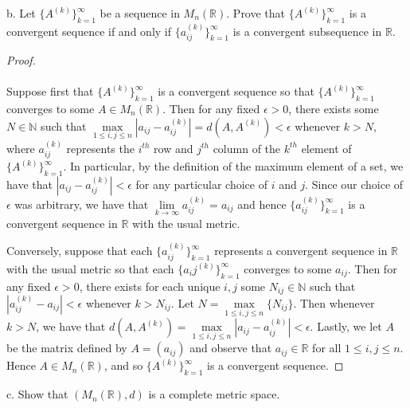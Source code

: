     \pagebreak

b.  Let $\{A^{(k)}\}_{k=1}^{\infty}$ be a sequence in $M_n(\mathbb{R})$. Prove that $\{A^{(k)}\}_{k=1}^{\infty}$ is a
    convergent sequence if and only if $\{a_{ij}^{(k)}\}_{k=1}^{\infty}$ is a convergent subsequence in $\mathbb{R}$.\ \\

    \begin{proof}\ \\\\
        Suppose first that $\{A^{(k)}\}_{k=1}^{\infty}$ is a convergent sequence so that $\{A^{(k)}\}_{k=1}^{\infty}$ 
        converges to some $A \in M_n(\mathbb{R})$. Then for any fixed $\epsilon > 0$, there exists some 
        $N \in \mathbb{N}$ such that $\max\limits_{1 \le i,j \le n}{|a_{ij} - a^{(k)}_{ij}|} = d(A, A^{(k)}) < \epsilon$
        whenever $k > N$, where $a_{ij}^{(k)}$ represents the $i^{th}$ row and $j^{th}$ column of the $k^{th}$ element 
        of $\{A^{(k)}\}_{k=1}^{\infty}$. In particular, by the definition of the maximum element of a set, we have that 
        $|a_{ij} - a_{ij}^{(k)}| < \epsilon$ for any particular choice of $i$ and $j$. Since our choice of $\epsilon$ 
        was arbitrary, we have that $\lim\limits_{k \to \infty}{a_{ij}^{(k)} = a_{ij}}$ and hence 
        $\{a_{ij}^{(k)}\}_{k=1}^{\infty}$ is a convergent sequence in $\mathbb{R}$ with the usual metric.
        
        Conversely, suppose that each $\{a_{ij}^{(k)}\}_{k=1}^{\infty}$ represents a convergent sequence in $\mathbb{R}$
        with the usual metric so that each $\{a_ij^{(k)}\}_{k=1}^{\infty}$ converges to some $a_{ij}$. Then for any 
        fixed $\epsilon > 0$, there exists for each unique $i, j$ some $N_{ij} \in \mathbb{N}$ such that 
        $|a_{ij}^{(k)} - a_{ij}| < \epsilon$ whenever $k > N_{ij}$. Let $N = \max\limits_{1 \le i,j \le n}{\{N_{ij}\}}$.
        Then whenever $k > N$, we have that 
        $d(A, A^{(k)}) = \max\limits_{1 \le i,j \le n}{|a_{ij} - a^{(k)}_{ij}|} < \epsilon$. Lastly, we let 
        $A$ be the matrix defined by $A = \left(a_{ij}\right)$ and observe that $a_{ij} \in \mathbb{R}$ for all
        $1 \le i,j \le n$. Hence $A \in M_n(\mathbb{R})$, and so $\{A^{(k)}\}_{k=1}^{\infty}$ is a convergent sequence.
    \end{proof}

    \pagebreak

c.  Show that $\left(M_n(\mathbb{R}), d\right)$ is a complete metric space.

